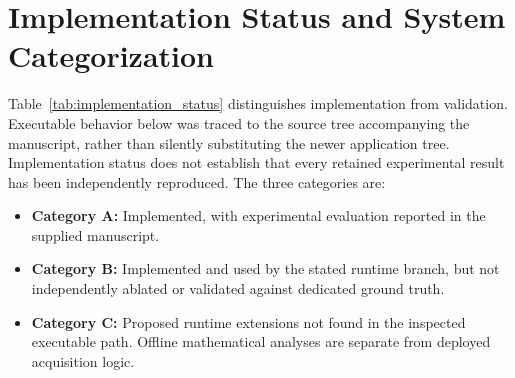 \documentclass[journal]{IEEEtran}
\begin{document}
\section{Implementation Status and System Categorization}
\label{sec:implementation_status}

Table~\ref{tab:implementation_status} distinguishes implementation from validation. Executable behavior below was traced to the source tree accompanying the manuscript, rather than silently substituting the newer application tree. Implementation status does not establish that every retained experimental result has been independently reproduced. The three categories are:
\begin{itemize}
    \item \textbf{Category A:} Implemented, with experimental evaluation reported in the supplied manuscript.
    \item \textbf{Category B:} Implemented and used by the stated runtime branch, but not independently ablated or validated against dedicated ground truth.
    \item \textbf{Category C:} Proposed runtime extensions not found in the inspected executable path. Offline mathematical analyses are separate from deployed acquisition logic.
\end{itemize}
\end{document}
